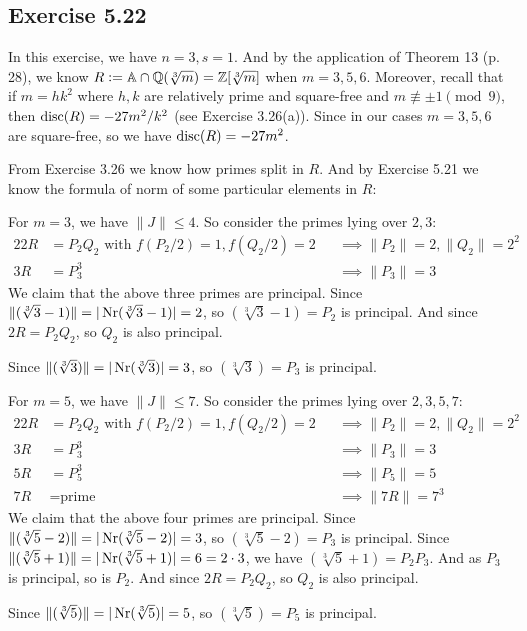 \documentclass[../Marcus.tex]{subfiles}
\begin{document}
\subsection*{Exercise 5.22}

In this exercise, we have $n=3,s=1$. And by the application of Theorem 13 (p. 28), we know $R := \mathbb{A} \cap \mathbb{Q}(\sqrt[3]{m}) = \mathbb{Z}[\sqrt[3]{m}]$ when $m=3,5,6$. Moreover, recall that if $m = hk^2$ where $h, k$ are relatively prime and square-free and $m \not\equiv \pm1 \pmod{9}$, then $\operatorname{disc}(R) = -27m^2/k^2$ (see Exercise 3.26(a)). Since in our cases $m=3,5,6$ are square-free, so we have $\operatorname{disc}(R) = -27m^2$.

From Exercise 3.26 we know how primes split in $R$. And by Exercise 5.21 we know the formula of norm of some particular elements in $R$:

For $m=3$, we have $\|J\| \leq 4$. So consider the primes lying over $2,3$:
\begin{alignat*}{2}
2R &= P_2Q_2 \text{ with } f(P_2/2) = 1, f(Q_2/2) = 2 &&\implies \|P_2\| = 2, \|Q_2\| = 2^2    \\
3R &= P_3^3 &&\implies \|P_3\| = 3
\end{alignat*}
We claim that the above three primes are principal. Since $\|(\sqrt[3]{3}-1)\| = |\operatorname{Nr}(\sqrt[3]{3}-1)| = 2$, so $(\sqrt[3]{3}-1) = P_2$ is principal. And since $2R = P_2Q_2$, so $Q_2$ is also principal.

Since $\|(\sqrt[3]{3})\| = |\operatorname{Nr}(\sqrt[3]{3})| = 3$, so $(\sqrt[3]{3}) = P_3$ is principal.

For $m=5$, we have $\|J\| \leq 7$. So consider the primes lying over $2,3,5,7$:
\begin{alignat*}{2}
2R &= P_2Q_2 \text{ with } f(P_2/2) = 1, f(Q_2/2) = 2 &&\implies \|P_2\| = 2, \|Q_2\| = 2^2    \\
3R &= P_3^3 &&\implies \|P_3\| = 3    \\
5R &= P_5^3 &&\implies \|P_5\| = 5    \\
7R &= \text{prime} &&\implies \|7R\| = 7^3
\end{alignat*}
We claim that the above four primes are principal. Since $\|(\sqrt[3]{5}-2)\| = |\operatorname{Nr}(\sqrt[3]{5}-2)| = 3$, so $(\sqrt[3]{5}-2) = P_3$ is principal. Since $\|(\sqrt[3]{5}+1)\| = |\operatorname{Nr}(\sqrt[3]{5}+1)| = 6 = 2\cdot 3$, we have $(\sqrt[3]{5}+1) = P_2P_3$. And as $P_3$ is principal, so is $P_2$. And since $2R = P_2Q_2$, so $Q_2$ is also principal.

Since $\|(\sqrt[3]{5})\| = |\operatorname{Nr}(\sqrt[3]{5})| = 5$, so $(\sqrt[3]{5}) = P_5$ is principal.
\end{document}
